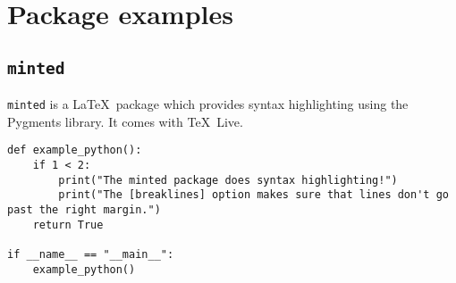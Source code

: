 \section{Package examples}
\subsection{\texttt{minted}}

\texttt{minted} is a \LaTeX\ package which provides syntax highlighting
using the Pygments library. It comes with \TeX\ Live.

\begin{verbatim}
def example_python():
    if 1 < 2:
        print("The minted package does syntax highlighting!")
        print("The [breaklines] option makes sure that lines don't go past the right margin.")
    return True

if __name__ == "__main__":
    example_python()
\end{verbatim}
